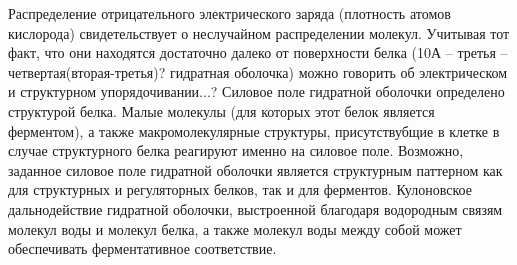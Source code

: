 \documentclass[a4paper]{article}
\begin{document}
Распределение отрицательного электрического заряда (плотность атомов кислорода) свидетельствует о неслучайном распределении молекул. Учитывая тот факт, что они находятся достаточно далеко от поверхности белка (10А – третья – четвертая(вторая-третья)? гидратная оболочка) можно говорить об электрическом и структурном упорядочивании...? Силовое поле гидратной оболочки определено структурой белка. Малые молекулы (для которых этот белок является ферментом), а также макромолекулярные структуры, присутствубщие в клетке в случае структурного белка реагируют именно на силовое поле. Возможно, заданное силовое поле гидратной оболочки является структурным паттерном как для структурных и регуляторных белков, так и для ферментов. Кулоновское дальнодействие гидратной оболочки, выстроенной благодаря водородным связям молекул воды и молекул белка, а также молекул воды между собой может обеспечивать ферментативное соответствие.
\end{document}

